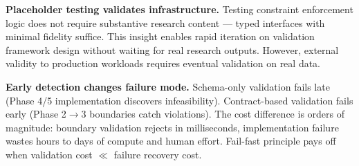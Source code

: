 \textbf{Placeholder testing validates infrastructure.} Testing constraint enforcement logic does not require substantive research content --- typed interfaces with minimal fidelity suffice. This insight enables rapid iteration on validation framework design without waiting for real research outputs. However, external validity to production workloads requires eventual validation on real data.

\textbf{Early detection changes failure mode.} Schema-only validation fails late (Phase 4/5 implementation discovers infeasibility). Contract-based validation fails early (Phase 2$\rightarrow$3 boundaries catch violations). The cost difference is orders of magnitude: boundary validation rejects in milliseconds, implementation failure wastes hours to days of compute and human effort. Fail-fast principle pays off when validation cost $\ll$ failure recovery cost.
